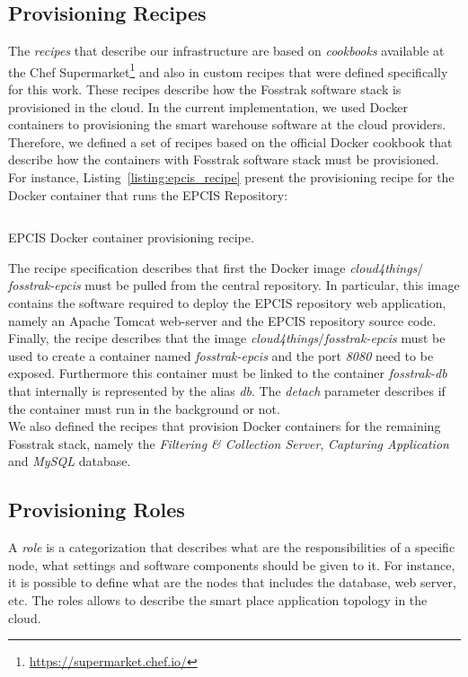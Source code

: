 \subsection{Provisioning Recipes}
\label{sub:recipes}
The \textit{recipes} that describe our infrastructure are based on \textit{cookbooks} available at the
Chef Supermarket\footnote{\url{https://supermarket.chef.io/}} and also in custom recipes that
were defined specifically for this work. These recipes describe how the Fosstrak software
stack is provisioned in the cloud. In the current implementation, we used Docker containers to provisioning
the smart warehouse software at the cloud providers. Therefore, we defined a set of recipes
based on the official Docker cookbook that describe how the containers with Fosstrak software
stack must be provisioned. For instance, Listing~\ref{listing:epcis_recipe} present the provisioning
recipe for the Docker container that runs the \gls{EPCIS} Repository:

\begin{listing}
  \inputminted[frame=lines,
                 framesep=3mm,
                 linenos=true,
                 xleftmargin=21pt,
                 tabsize=4]{ruby}{./listings/epcis_recipe.rb}
  \caption{EPCIS Docker container provisioning recipe.}
  \label{listing:epcis_recipe}
\end{listing}

The recipe specification describes that first the Docker image \textit{cloud4things$/$fosstrak-epcis}
must be pulled from the central repository. In particular, this image contains the software required
to deploy the \gls{EPCIS} repository web application, namely an Apache Tomcat web-server and the \gls{EPCIS}
repository source code. Finally, the recipe describes that the image \textit{cloud4things$/$fosstrak-epcis}
must be used to create a container named \textit{fosstrak-epcis} and the port \textit{8080} need to
be exposed. Furthermore this container must be linked to the container \textit{fosstrak-db} that
internally is represented by the alias \textit{db}. The \textit{detach} parameter describes if the
container must run in the background or not.\\

We also defined the recipes that provision Docker containers for the remaining Fosstrak
stack, namely the \textit{Filtering \& Collection Server}, \textit{Capturing Application} and
\textit{MySQL} database.

\subsection{Provisioning Roles}
\label{sub:provisioning_roles}
A \textit{role} is a categorization that describes what are the responsibilities of a specific
node, what settings and software components should be given to it. For instance, it is possible
to define what are the nodes that includes the database, web server, etc. The roles allows to describe
the smart place application topology in the cloud.\\


